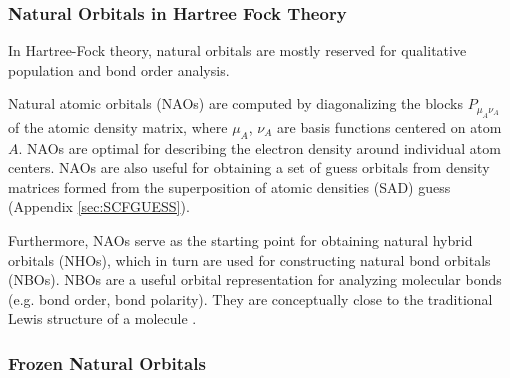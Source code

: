 

\subsubsection{Natural Orbitals in Hartree Fock Theory}

In Hartree-Fock theory, natural orbitals are mostly reserved for qualitative population and bond order analysis. 

Natural atomic orbitals (NAOs) are computed by diagonalizing the blocks $P_{\mu_A\nu_A}$ of the atomic density matrix, where ${\mu_A}$, ${\nu_A}$ are basis functions centered on atom $A$. NAOs are optimal for describing the electron density around individual atom centers. NAOs are also useful for obtaining a set of guess orbitals from density matrices formed from the superposition of atomic densities (SAD) guess (Appendix \ref{sec:SCFGUESS}). 

Furthermore, NAOs serve as the starting point for obtaining natural hybrid orbitals (NHOs), which in turn are used for constructing natural bond orbitals (NBOs). NBOs are a useful orbital representation for  analyzing molecular bonds (e.g. bond order, bond polarity). They are conceptually close to the traditional Lewis structure of a molecule \cite{Ree1983,Wei2001,Gle2012}.


\subsubsection{Frozen Natural Orbitals}


